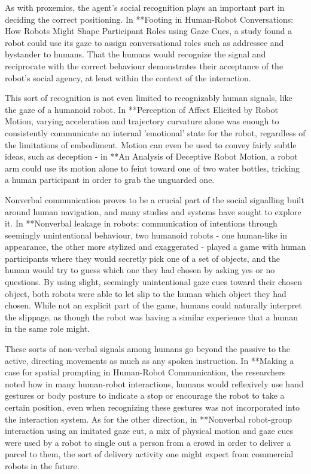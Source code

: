\documentclass{sfuthesis}
\begin{document}
As with proxemics, the agent's social recognition plays an important part in deciding the correct positioning. In **Footing in Human-Robot Conversations: How Robots Might Shape Participant Roles using Gaze Cues, a study found a robot could use its gaze to assign conversational roles such as addressee and bystander to humans. That the humans would recognize the signal and reciprocate with the correct behaviour demonstrates their acceptance of the robot's social agency, at least within the context of the interaction.

This sort of recognition is not even limited to recognizably human signals, like the gaze of a humanoid robot. In **Perception of Affect Elicited by Robot Motion, varying acceleration and trajectory curvature alone was enough to consistently communicate an internal 'emotional' state for the robot, regardless of the limitations of embodiment. Motion can even be used to convey fairly subtle ideas, such as deception - in **An Analysis of Deceptive Robot Motion, a robot arm could use its motion alone to feint toward one of two water bottles, tricking a human participant in order to grab the unguarded one.

Nonverbal communication proves to be a crucial part of the social signalling built around human navigation, and many studies and systems have sought to explore it. In **Nonverbal leakage in robots: communication of intentions through seemingly unintentional behaviour, two humanoid robots - one human-like in appearance, the other more stylized and exaggerated - played a game with human participants where they would secretly pick one of a set of objects, and the human would try to guess which one they had chosen by asking yes or no questions. By using slight, seemingly unintentional gaze cues toward their chosen object, both robots were able to let slip to the human which object they had chosen. While not an explicit part of the game, humans could naturally interpret the slippage, as though the robot was having a similar experience that a human in the same role might.

These sorts of non-verbal signals among humans go beyond the passive to the active, directing movements as much as any spoken instruction. In **Making a case for spatial prompting in Human-Robot Communication, the researchers noted how in many human-robot interactions, humans would reflexively use hand gestures or body posture to indicate a stop or encourage the robot to take a certain position, even when recognizing these gestures was not incorporated into the interaction system. As for the other direction, in **Nonverbal robot-group interaction using an imitated gaze cut, a mix of physical motion and gaze cues were used by a robot to single out a person from a crowd in order to deliver a parcel to them, the sort of delivery activity one might expect from commercial robots in the future. 
\end{document}
